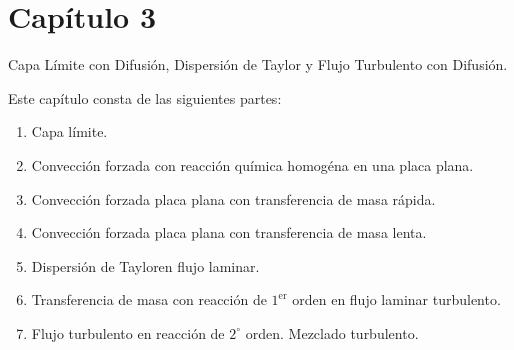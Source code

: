 
\chapter{Capítulo 3}
Capa Límite con Difusión, Dispersión de Taylor y Flujo Turbulento con Difusión.

Este capítulo consta de las siguientes partes:
\begin{enumerate}
    \item Capa límite.
    \item Convección forzada con reacción química homogéna en una placa plana.
    \item Convección forzada  placa plana con transferencia de masa rápida.
    \item Convección forzada  placa plana con transferencia de masa lenta.
    \item Dispersión de Tayloren flujo laminar.
    \item Transferencia de masa con reacción de $1^{\text{er}}$ orden en flujo laminar turbulento.
    \item Flujo turbulento en reacción de $2^{\circ}$ orden. Mezclado turbulento.
\end{enumerate}
